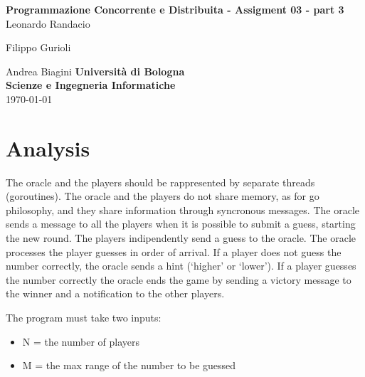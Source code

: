\documentclass[12pt, a4paper]{report}
\begin{document}
\renewcommand\bibname{References} %


\begin{titlepage}

\begin{center}

\Large \textbf {Programmazione Concorrente e Distribuita - Assigment 03 - part 3}\\%
\vspace{1em}%
\vfill
Leonardo Randacio


Filippo Gurioli


Andrea Biagini
\vspace{1em}
\vfill
{\bf Università di Bologna \\ Scienze e Ingegneria Informatiche}\\[0.5in]

       
\vfill
\today

\end{center}

\end{titlepage}


\tableofcontents
\listoffigures

\newpage
{} %

\chapter{Analysis}
The oracle and the players should be rappresented by separate threads (goroutines). The oracle and the players do not share memory, as for go philosophy,
 and they share information through syncronous messages. The oracle sends a message to all the players when it is possible to submit a guess, starting the
 new round. The players indipendently send a guess to the oracle. The oracle processes the player guesses in order of arrival. If a player does not guess
 the number correctly, the oracle sends a hint (`higher' or `lower'). If a player guesses the number correctly the oracle ends the game by sending a victory
 message to the winner and a notification to the other players.

The program must take two inputs:
\begin{itemize}
    \item N = the number of players
    \item M = the max range of the number to be guessed
\end{itemize}
\end{document}
